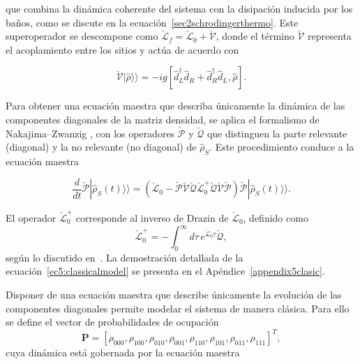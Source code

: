 que combina la dinámica coherente del sistema con la disipación inducida por los baños, como se discute en la ecuación~\eqref{sec2schrodingerthermo}. Este superoperador se descompone como $\check{\mathcal{L}}_{f} = \check{\mathcal{L}}_{0} + \check{\mathcal{V}}$, donde el término $\check{\mathcal{V}}$ representa el acoplamiento entre los sitios y actúa de acuerdo con

\begin{equation*}
\check{\mathcal{V}}|\hat{\rho}\rangle\rangle = -ig[\hat{d}_{L}^{\dagger} \hat{d}_{R} + \hat{d}_{R}^{\dagger} \hat{d}_{L}, \hat{\rho}].
\end{equation*}

Para obtener una ecuación maestra que describa únicamente la dinámica de las componentes diagonales de la matriz densidad, se aplica el formalismo de Nakajima–Zwanzig \cite{zwanzig1966statistical}, con los operadores $\check{\mathcal{P}}$ y $\check{\mathcal{Q}}$ que distinguen la parte relevante (diagonal) y la no relevante (no diagonal) de $\hat{\rho}_{S}$. Este procedimiento conduce a la ecuación maestra

\begin{equation}
    \frac{d}{dt}\check{\mathcal{P}}|\hat{\rho}_{S}(t)\rangle \rangle = \left(\check{\mathcal{L}}_{0} - \check{\mathcal{P}}\check{\mathcal{V}}\check{\mathcal{Q}}\check{\mathcal{L}}^{+}_{0}\check{\mathcal{Q}}\check{\mathcal{V}}\check{\mathcal{P}}\right)\check{\mathcal{P}}|\hat{\rho}_{S}(t)\rangle \rangle. 
\label{ec5:classicalmodel}
\end{equation}

El operador $\check{\mathcal{L}}_{0}^{+}$ corresponde al inverso de Drazin de $\check{\mathcal{L}}_{0}$, definido como
\begin{equation*}
\check{\mathcal{L}}_{0}^{+} = -\int_{0}^{\infty} d\tau\, e^{\check{\mathcal{L}}_{0} \tau} \check{\mathcal{Q}},
\end{equation*}
según lo discutido en~\cite{landi2024current}. La demostración detallada de la ecuación~\eqref{ec5:classicalmodel} se presenta en el Apéndice~\ref{appendix5clasic}.

Disponer de una ecuación maestra que describe únicamente la evolución de las componentes diagonales permite modelar el sistema de manera clásica. Para ello se define el vector de probabilidades de ocupación
\begin{equation*}
\mathbf{P} = [\rho_{000}, \rho_{100}, \rho_{010}, \rho_{001}, \rho_{110}, \rho_{101}, \rho_{011}, \rho_{111}]^{T},
\end{equation*}
cuya dinámica está gobernada por la ecuación maestra

